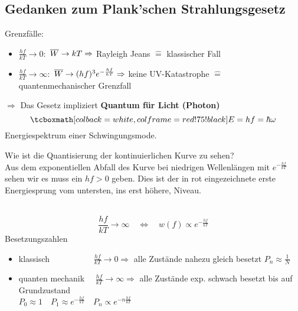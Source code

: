 \subsection{Gedanken zum Plank'schen Strahlungsgesetz}

Grenzfälle:
\begin{itemize}
	\item $ \frac{hf}{kT} \to 0 : $ $ \overline{W} \to kT \Rightarrow $ Rayleigh Jeans $ \widehat{=} $ klassischer Fall
	\item $ \frac{hf}{kT} \to \infty : $ $ \overline{W} \to (hf)^3 e^{-\frac{hf}{kT}} \Rightarrow $ keine UV-Katastrophe $ \widehat{=} $ quantenmechanischer Grenzfall
\end{itemize}
$ \Rightarrow $ Das Gesetz impliziert \textbf{Quantum für Licht (Photon)}
\begin{equation*}
\rmbox{E = hf = \hbar \omega }
\end{equation*}
Energiespektrum einer Schwingungsmode.\\
\begin{minipage}{.6\linewidth}
	Wie ist die Quantisierung der kontinuierlichen Kurve zu sehen?\\
	Aus dem exponentiellen Abfall des Kurve bei niedrigen Wellenlängen mit $ e^{-\frac{hf}{kT}} $ sehen wir es muss ein $ hf > 0 $ geben. Dies ist der in rot eingezeichnete erste Energiesprung vom untersten, ins erst höhere, Niveau.
\end{minipage}%
\begin{minipage}{.4\linewidth}
	\flushright
\end{minipage}%
\\
\begin{equation*}
\frac{hf}{kT} \to \infty \quad \Leftrightarrow \quad w(f) \propto e^{-\frac{hf}{kT}}
\end{equation*}
Besetzungszahlen
\begin{itemize}
	\item klassisch $ \qquad \qquad \quad \frac{hf}{kT} \to 0  \Rightarrow $ alle Zustände nahezu gleich besetzt $ P_n \approx \frac{1}{N} $
	\item quanten mechanik $ \ \ \ \, \, \frac{hf}{kT} \to \infty \Rightarrow $ alle Zustände exp. schwach besetzt bis auf Grundzustand\\
	$ P_0 \approx 1 \quad P_1 \approx e^{-\frac{hf}{kT}} \quad P_n \propto e^{- n \frac{hf}{kT}} $
\end{itemize}
